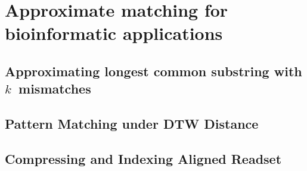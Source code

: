 \part{Approximate matching for bioinformatic applications}

\mainmatter
\chapter{Approximating longest common substring with \texorpdfstring{$k$}{k}~mismatches}\label{chap:LCS}%

\mainmatter
\chapter{Pattern Matching under DTW Distance}\label{chap:DTW}

\mainmatter
\chapter{Compressing and Indexing Aligned Readset}\label{chap:XBWT}

